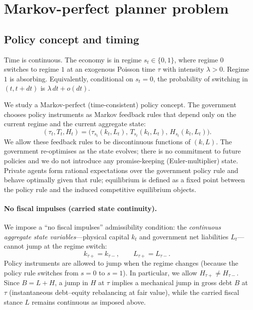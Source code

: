 \documentclass{article}
\begin{document}

\section{Markov-perfect planner problem}

\subsection{Policy concept and timing}

Time is continuous. The economy is in regime $s_t \in \{0,1\}$, where regime $0$ switches to regime $1$
at an exogenous Poisson time $\tau$ with intensity $\lambda>0$. Regime $1$ is absorbing. Equivalently,
conditional on $s_t=0$, the probability of switching in $(t,t+dt)$ is $\lambda\,dt+o(dt)$.

We study a Markov-perfect (time-consistent) policy concept. The government chooses policy instruments as
Markov feedback rules that depend only on the current regime and the current aggregate state:
\[
(\tau_t,T_t,H_t)=\big(\tau_{s_t}(k_t,L_t),\,T_{s_t}(k_t,L_t),\,H_{s_t}(k_t,L_t)\big).
\]
We allow these feedback rules to be discontinuous functions of $(k,L)$. The government re-optimises as the state
evolves; there is no commitment to future policies and we do not introduce any promise-keeping (Euler-multiplier)
state. Private agents form rational expectations over the government policy rule and behave optimally given that rule;
equilibrium is defined as a fixed point between the policy rule and the induced competitive equilibrium objects.

\paragraph{No fiscal impulses (carried state continuity).}
We impose a ``no fiscal impulses'' admissibility condition: the \emph{continuous aggregate state variables}---physical
capital $k_t$ and government net liabilities $L_t$---cannot jump at the regime switch:
\[
k_{\tau+}=k_{\tau-},\qquad L_{\tau+}=L_{\tau-}.
\tag{28}
\]
Policy instruments are allowed to jump when the regime changes (because the policy rule switches from $s=0$ to $s=1$).
In particular, we allow $H_{\tau+}\neq H_{\tau-}$. Since $B=L+H$, a jump in $H$ at $\tau$ implies a mechanical jump in
gross debt $B$ at $\tau$ (instantaneous debt--equity rebalancing at fair value), while the carried fiscal stance $L$ remains
continuous as imposed above.
\end{document}
